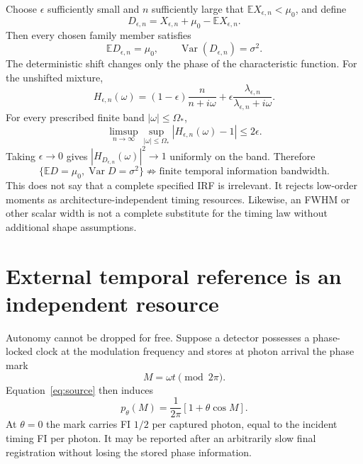 \documentclass[aps,prapplied,preprint,nofootinbib]{revtex4-2}
\begin{document}
Choose $\epsilon$ sufficiently small and $n$ sufficiently large that $\mathbb E X_{\epsilon,n}<\mu_0$, and define
\begin{equation}
D_{\epsilon,n}=X_{\epsilon,n}
+\mu_0-\mathbb E X_{\epsilon,n}.
\end{equation}
Then every chosen family member satisfies
\begin{equation}
\boxed{
\mathbb E D_{\epsilon,n}=\mu_0,
\qquad
\operatorname{Var}(D_{\epsilon,n})=\sigma^2.}
\end{equation}
The deterministic shift changes only the phase of the characteristic function. For the unshifted mixture,
\begin{equation}
H_{\epsilon,n}(\omega)
=(1-\epsilon)\frac{n}{n+i\omega}
+\epsilon\frac{\lambda_{\epsilon,n}}{\lambda_{\epsilon,n}+i\omega}.
\end{equation}
For every prescribed finite band $|\omega|\le\Omega_*$,
\begin{equation}
\limsup_{n\to\infty}
\sup_{|\omega|\le\Omega_*}
|H_{\epsilon,n}(\omega)-1|
\le2\epsilon.
\end{equation}
Taking $\epsilon\to0$ gives $|H_{D_{\epsilon,n}}(\omega)|^2\to1$ uniformly on the band. Therefore
\begin{equation}
\boxed{
\{\mathbb E D=\mu_0,\operatorname{Var}D=\sigma^2\}
\not\Rightarrow
\text{finite temporal information bandwidth}.}
\end{equation}
This does not say that a complete specified IRF is irrelevant. It rejects low-order moments as architecture-independent timing resources. Likewise, an FWHM or other scalar width is not a complete substitute for the timing law without additional shape assumptions.

\section{External temporal reference is an independent resource}
\label{sec:clock}

Autonomy cannot be dropped for free. Suppose a detector possesses a phase-locked clock at the modulation frequency and stores at photon arrival the phase mark
\begin{equation}
M=\omega t\pmod{2\pi}.
\end{equation}
Equation~\eqref{eq:source} then induces
\begin{equation}
p_\theta(M)=\frac{1}{2\pi}[1+\theta\cos M].
\end{equation}
At $\theta=0$ the mark carries FI $1/2$ per captured photon, equal to the incident timing FI per photon. It may be reported after an arbitrarily slow final registration without losing the stored phase information.
\end{document}
